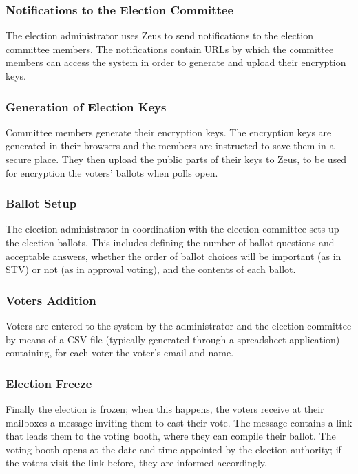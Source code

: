 \documentclass[letterpaper,twocolumn,10pt]{article}
\begin{document}
\subsubsection{Notifications to the Election Committee}

The election administrator uses Zeus to send notifications to the
election committee members. The notifications contain URLs by which
the committee members can access the system in order to generate and
upload their encryption keys.

\subsubsection{Generation of Election Keys}

Committee members generate their encryption keys. The encryption keys
are generated in their browsers and the members are instructed to save
them in a secure place. They then upload the public parts of their
keys to Zeus, to be used for encryption the voters' ballots when polls
open. 

\subsubsection{Ballot Setup}

The election administrator in coordination with the election committee
sets up the election ballots. This includes defining the number of
ballot questions and acceptable answers, whether the order of ballot
choices will be important (as in STV) or not (as in approval voting),
and the contents of each ballot.

\subsubsection{Voters Addition}

Voters are entered to the system by the administrator and the election
committee by means of a CSV file (typically generated through a
spreadsheet application) containing, for each voter the voter's email
and name.

\subsubsection{Election Freeze}

Finally the election is frozen; when this happens, the voters receive
at their mailboxes a message inviting them to cast their vote. The
message contains a link that leads them to the voting booth, where
they can compile their ballot. The voting booth opens at the date and
time appointed by the election authority; if the voters visit the link
before, they are informed accordingly.
\end{document}
